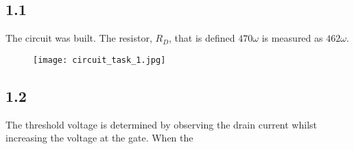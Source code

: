 \subsection*{1.1}
The circuit was built. The resistor, $R_D$, that is defined $470 \omega$  is measured as $462 \omega$.

    \begin{figure}[h!]
        \centering
        \texttt{[image: circuit\_task\_1.jpg]}
    \end{figure}

\subsection*{1.2}
The threshold voltage is determined by observing the drain current whilst increasing the voltage at the gate. When the







